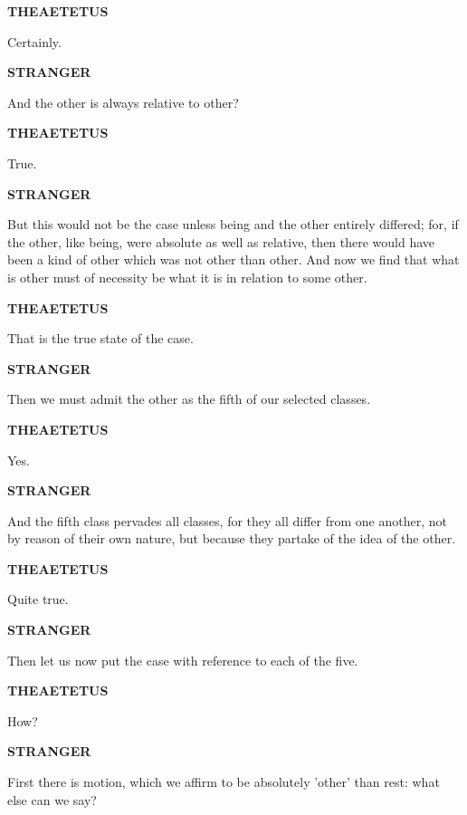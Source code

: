 \documentclass[11pt,letter]{article}
\begin{document}
\par \textbf{THEAETETUS}
\par   Certainly.

\par \textbf{STRANGER}
\par   And the other is always relative to other?

\par \textbf{THEAETETUS}
\par   True.

\par \textbf{STRANGER}
\par   But this would not be the case unless being and the other entirely differed; for, if the other, like being, were absolute as well as relative, then there would have been a kind of other which was not other than other. And now we find that what is other must of necessity be what it is in relation to some other.

\par \textbf{THEAETETUS}
\par   That is the true state of the case.

\par \textbf{STRANGER}
\par   Then we must admit the other as the fifth of our selected classes.

\par \textbf{THEAETETUS}
\par   Yes.

\par \textbf{STRANGER}
\par   And the fifth class pervades all classes, for they all differ from one another, not by reason of their own nature, but because they partake of the idea of the other.

\par \textbf{THEAETETUS}
\par   Quite true.

\par \textbf{STRANGER}
\par   Then let us now put the case with reference to each of the five.

\par \textbf{THEAETETUS}
\par   How?

\par \textbf{STRANGER}
\par   First there is motion, which we affirm to be absolutely 'other' than rest:  what else can we say?
\end{document}
